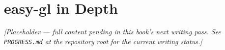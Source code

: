 \chapter{easy-gl in Depth}
\label{ch:easygl-deep-dive}

\emph{[Placeholder --- full content pending in this book's next writing pass. See \texttt{PROGRESS.md} at the repository root for the current writing status.]}
